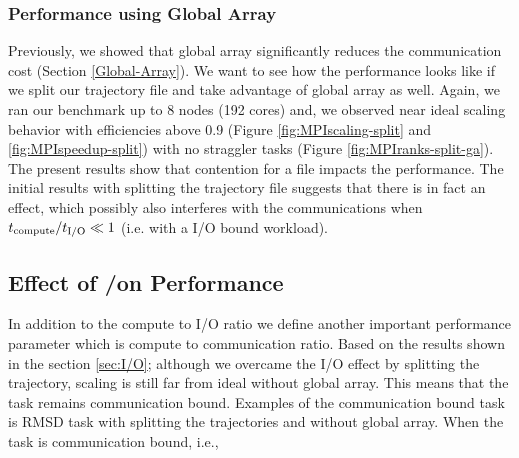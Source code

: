 \subsubsection*{Performance using Global Array}
Previously, we showed that global array significantly reduces the communication cost (Section \ref{Global-Array}). 
We want to see how the performance looks like if we split our trajectory file and take advantage of global array as well.
Again, we ran our benchmark up to 8 nodes (192 cores) and, we observed near ideal scaling behavior with efficiencies above 0.9 (Figure \ref{fig:MPIscaling-split} and \ref{fig:MPIspeedup-split}) with no straggler tasks (Figure \ref{fig:MPIranks-split-ga}).  
The present results show that contention for a file impacts the performance. 
The initial results with splitting the trajectory file suggests that there is in fact an effect, which possibly also interferes with the communications when ${t}_{\text{compute}}/{t}_{\text{I/O}} \ll 1$ (i.e. with a I/O bound workload).

\subsection{Effect of \tcomp/\tcomm on Performance}

In addition to the compute to I/O ratio we define another important performance parameter which is compute to communication ratio.
Based on the results shown in the section \ref{sec:I/O}; although we overcame the I/O effect by splitting the trajectory, scaling is still far from ideal without global array.
This means that the task remains communication bound. 
Examples of the communication bound task is RMSD task with splitting the trajectories and without global array.
When the task is communication bound, i.e.,

